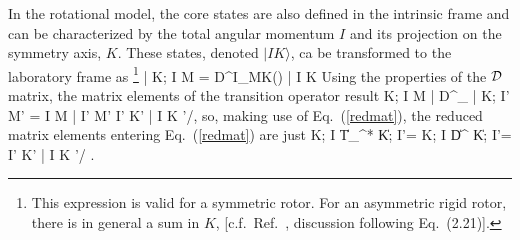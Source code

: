 \documentclass[preprint,12pt]{elsarticle}
\begin{document}
In the rotational model, the core states are also defined in the intrinsic frame and can be characterized by the total angular momentum $I$ and its projection on the symmetry axis, $K$. These states, denoted $|I K \rangle$, ca be transformed to the laboratory frame as%
\footnote{This expression is valid for a symmetric rotor. For an asymmetric rigid rotor, there is in general a sum in $K$, [c.f.~Ref.~\cite{BS}, discussion following Eq.~(2.21)].}
%
\be
| K; I M \rangle =  {\cal D}^{I}_{MK}(\omega) | I K \rangle
\ee
%
Using the properties of the ${\cal D}$ matrix, the matrix elements of the transition operator result
\be
\langle K; I M | {\cal D}^{\lambda}_{} | K; I' M' \rangle = 
    \langle I M \lambda \mu | I' M' \rangle \langle I' K'  | I K \rangle  {}'/,
\ee
so, making use of Eq.~(\ref{redmat}), the reduced matrix elements entering Eq.~(\ref{redmat}) are just
\be
\langle K; I  \| {\cal T}_{\lambda}^{*} \| K; I'\rangle =
\langle K; I  \| {\cal D}^{\lambda} \| K; I'\rangle = 
    \langle I' K'  | I K \rangle {}'/ .
\ee
 
\end{document}
